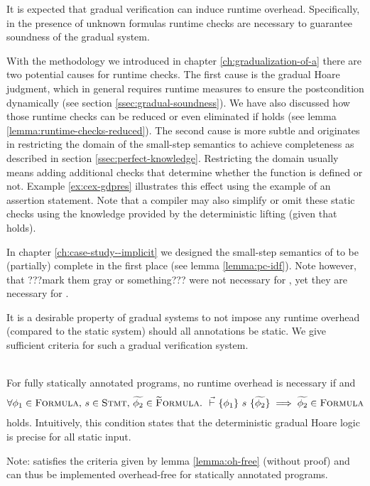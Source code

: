It is expected that gradual verification can induce runtime overhead.
Specifically, in the presence of unknown formulas runtime checks are necessary to guarantee soundness of the gradual system.

With the methodology we introduced in chapter \ref{ch:gradualization-of-a} there are two potential causes for runtime checks.
The first cause is the gradual Hoare judgment, which in general requires runtime measures to ensure the postcondition dynamically (see section \ref{ssec:gradual-soundness}).
We have also discussed how those runtime checks can be reduced or even eliminated if  holds (see lemma \ref{lemma:runtime-checks-reduced}).
The second cause is more subtle and originates in restricting the domain of the small-step semantics to achieve completeness as described in section \ref{ssec:perfect-knowledge}.
Restricting the domain usually means adding additional checks that determine whether the function is defined or not.
Example \ref{ex:cex-gdpres} illustrates this effect using the example of an assertion statement.
Note that a compiler may also simplify or omit these static checks using the knowledge provided by the deterministic lifting (given that   holds).

In chapter \ref{ch:case-study--implicit} we designed the small-step semantics of \svlidf to be (partially) complete in the first place (see lemma \ref{lemma:pc-idf}).
Note however, that ???mark them gray or something??? were not necessary for \svlidf, yet they are necessary for \gvlidf.

It is a desirable property of gradual systems to not impose any runtime overhead (compared to the static system) should all annotations be static.
We give sufficient criteria for such a gradual verification system.
\begin{lemma}
    \label{lemma:oh-free}~\\
    For fully statically annotated programs, no runtime overhead is necessary if  and
    \begin{align}
    \label{lemma-frm:oh-free}
    \forall \phi_1 \in \textup{\textsc{Formula}},\, s \in \textup{\textsc{Stmt}},\, \widetilde{\phi_2} \in \textup{\textsc{\ensuremath{\widetilde{\text{F}}}ormula}}.~ {} \,\,\vec{\vdash}\,\, \{{\phi_1}\} ~{s}~ \{{\widetilde{\phi_2}}\} \implies \widetilde{\phi_2} \in \textup{\textsc{Formula}}
    \end{align}
    holds.
    Intuitively, this condition states that the deterministic gradual Hoare logic is precise for all static input.
    
\end{lemma}

Note: \gvlidf satisfies the criteria given by lemma \ref{lemma:oh-free} (without proof) and can thus be implemented overhead-free for statically annotated programs.
